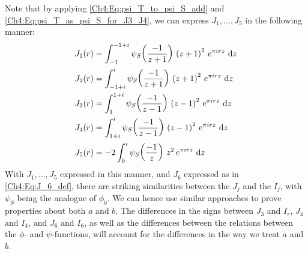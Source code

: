 Note that by applying \eqref{Ch4:Eq:psi_T_to_psi_S_add} and \eqref{Ch4:Eq:psi_T_as_psi_S_for_J3_J4}, we can express $J_1, \ldots, J_5$ in the following manner:
\begin{align}
    J_1(r) &= \int_{-1}^{-1 + i} \psi_S\of{\frac{-1}{z + 1}} \, \parenth{z + 1}^2 \, e^{\pi i r z} \, \diff{z} \label{Ch4:Eq:J1_like_I1} \\
    J_2(r) &= \int_{-1 + i}^{i} \psi_S\of{\frac{-1}{z + 1}} \, \parenth{z + 1}^2 \, e^{\pi i r z} \, \diff{z} \label{Ch4:Eq:J2_like_I2} \\
    J_3(r) &= \int_{1}^{1 + i} \psi_S\of{\frac{-1}{z - 1}} \, \parenth{z - 1}^2 \, e^{\pi i r z} \, \diff{z} \label{Ch4:Eq:J3_like_I3} \\
    J_4(r) &= \int_{1 + i}^{i} \psi_S\of{\frac{-1}{z - 1}} \, \parenth{z - 1}^2 \, e^{\pi i r z} \, \diff{z} \label{Ch4:Eq:J4_like_I4} \\
    J_5(r) &= -2 \int_{0}^{i} \psi_S\of{\frac{-1}{z}} \, z^2 \, e^{\pi i r z} \, \diff{z} \label{Ch4:Eq:J5_like_I5}
\end{align}
With $J_1, \ldots, J_5$ expressed in this manner, and $J_6$ expressed as in \eqref{Ch4:Eq:J_6_def}, there are striking similarities between the $J_j$ and the $I_j$, with $\psi_S$ being the analogue of $\phi_0$. We can hence use similar approaches to prove properties about both $a$ and $b$. The differences in the signs between $J_3$ and $I_r$, $J_4$ and $I_4$, and $J_6$ and $I_6$, as well as the differences between the relations between the $\phi$- and $\psi$-functions, will account for the differences in the way we treat $a$ and $b$.